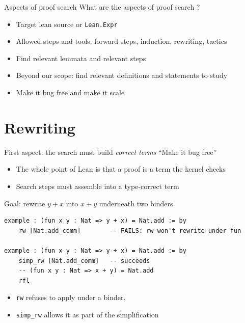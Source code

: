 \documentclass[aspectratio=169]{beamer}
\begin{document}
\begin{frame}[fragile]{Aspects of proof search}
What are the aspects of proof search ?
\begin{itemize}
	\item Target lean source or \texttt{Lean.Expr}
	\item Allowed steps and tools: forward steps, induction, rewriting, tactics
	\item Find relevant lemmata and relevant steps
	\item Beyond our scope: find relevant definitions and statements to study
	\item Make it bug free and make it scale
\end{itemize}
\end{frame}

\section{Rewriting}

\begin{frame}[fragile]{First aspect: the search must build \emph{correct terms}}
``Make it bug free''
\begin{itemize}
\item The whole point of Lean is that a proof is a \alert{term the kernel
      checks}
\item Search steps must assemble into a type-correct term
\end{itemize}

Goal: rewrite $y + x$ into $x + y$ underneath two binders

\begin{lstlisting}
example : (fun x y : Nat => y + x) = Nat.add := by
	rw [Nat.add_comm]        -- FAILS: rw won't rewrite under fun
	
example : (fun x y : Nat => y + x) = Nat.add := by
	simp_rw [Nat.add_comm]   -- succeeds
	-- (fun x y : Nat => x + y) = Nat.add
	rfl
\end{lstlisting}

\begin{itemize}
	\item \texttt{rw} refuses to apply under a binder.
	\item \texttt{simp\_rw} allows it as part of the simplification
\end{itemize}

\end{frame}
\end{document}
